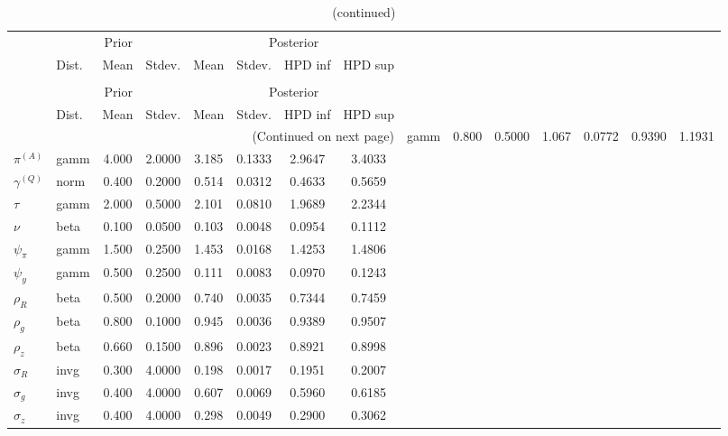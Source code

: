  
\begin{center}
\begin{longtable}{llcccccc} 
\caption{Results from Metropolis-Hastings (parameters)}
 \label{Table:MHPosterior:1}\\
\toprule 
  & \multicolumn{3}{c}{Prior}  &  \multicolumn{4}{c}{Posterior} \\
  \cmidrule(r{.75em}){2-4} \cmidrule(r{.75em}){5-8}
  & Dist. & Mean  & Stdev. & Mean & Stdev. & HPD inf & HPD sup\\
\midrule \endfirsthead 
\caption{(continued)}\\\toprule 
  & \multicolumn{3}{c}{Prior}  &  \multicolumn{4}{c}{Posterior} \\
  \cmidrule(r{.75em}){2-4} \cmidrule(r{.75em}){5-8}
  & Dist. & Mean  & Stdev. & Mean & Stdev. & HPD inf & HPD sup\\
\midrule \endhead 
\bottomrule \multicolumn{8}{r}{(Continued on next page)} \endfoot 
\bottomrule \endlastfoot 
${r_{A}}$ & gamm &   0.800 & 0.5000 &   1.067& 0.0772 &  0.9390 &  1.1931 \\ 
${\pi^{(A)}}$ & gamm &   4.000 & 2.0000 &   3.185& 0.1333 &  2.9647 &  3.4033 \\ 
${\gamma^{(Q)}}$ & norm &   0.400 & 0.2000 &   0.514& 0.0312 &  0.4633 &  0.5659 \\ 
${\tau}$ & gamm &   2.000 & 0.5000 &   2.101& 0.0810 &  1.9689 &  2.2344 \\ 
${\nu}$ & beta &   0.100 & 0.0500 &   0.103& 0.0048 &  0.0954 &  0.1112 \\ 
${\psi_\pi}$ & gamm &   1.500 & 0.2500 &   1.453& 0.0168 &  1.4253 &  1.4806 \\ 
${\psi_y}$ & gamm &   0.500 & 0.2500 &   0.111& 0.0083 &  0.0970 &  0.1243 \\ 
${\rho_R}$ & beta &   0.500 & 0.2000 &   0.740& 0.0035 &  0.7344 &  0.7459 \\ 
${\rho_{g}}$ & beta &   0.800 & 0.1000 &   0.945& 0.0036 &  0.9389 &  0.9507 \\ 
${\rho_z}$ & beta &   0.660 & 0.1500 &   0.896& 0.0023 &  0.8921 &  0.8998 \\ 
${\sigma_R}$ & invg &   0.300 & 4.0000 &   0.198& 0.0017 &  0.1951 &  0.2007 \\ 
${\sigma_{g}}$ & invg &   0.400 & 4.0000 &   0.607& 0.0069 &  0.5960 &  0.6185 \\ 
${\sigma_z}$ & invg &   0.400 & 4.0000 &   0.298& 0.0049 &  0.2900 &  0.3062 \\ 
\end{longtable}
 \end{center}
